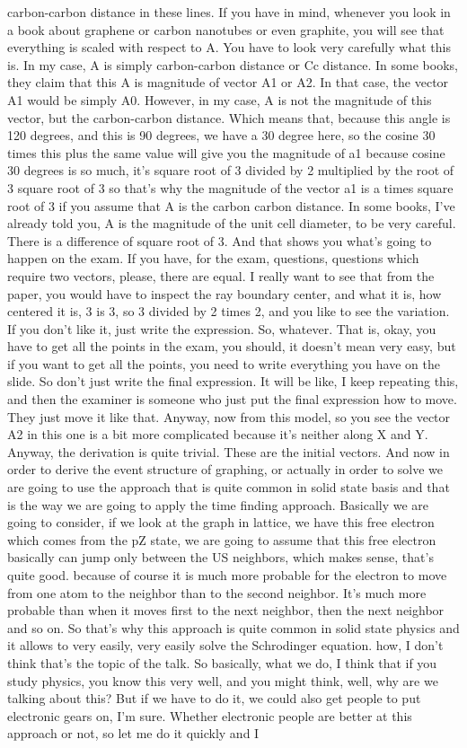 carbon-carbon distance in these lines. If you have in mind, whenever you look in a book about graphene or carbon nanotubes or even graphite, you will see that everything is scaled with respect to A. You have to look very carefully what this is. In my case, A is simply carbon-carbon distance or Cc distance. In some books, they claim that this A is magnitude of vector A1 or A2. In that case, the vector A1 would be simply A0. However, in my case, A is not the magnitude of this vector, but the carbon-carbon distance. Which means that, because this angle is 120 degrees, and this is 90 degrees, we have a 30 degree here, so the cosine 30 times this plus the same value will give you the magnitude of a1 because cosine 30 degrees is so much, it's square root of 3 divided by 2 multiplied by the root of 3 square root of 3 so that's why the magnitude of the vector a1 is a times square root of 3 if you assume that A is the carbon carbon distance. In some books, I've already told you, A is the magnitude of the unit cell diameter, to be very careful. There is a difference of square root of 3. And that shows you what's going to happen on the exam. If you have, for the exam, questions, questions which require two vectors, please, there are equal. I really want to see that from the paper, you would have to inspect the ray boundary center, and what it is, how centered it is, 3 is 3, so 3 divided by 2 times 2, and you like to see the variation. If you don't like it, just write the expression. So, whatever. That is, okay, you have to get all the points in the exam, you should, it doesn't mean very easy, but if you want to get all the points, you need to write everything you have on the slide. So don't just write the final expression. It will be like, I keep repeating this, and then the examiner is someone who just put the final expression how to move. They just move it like that. Anyway, now from this model, so you see the vector A2 in this one is a bit more complicated because it's neither along X and Y. Anyway, the derivation is quite trivial. These are the initial vectors. And now in order to derive the event structure of graphing, or actually in order to solve we are going to use the approach that is quite common in solid state basis and that is the way we are going to apply the time finding approach. Basically we are going to consider, if we look at the graph in lattice, we have this free electron which comes from the pZ state, we are going to assume that this free electron basically can jump only between the US neighbors, which makes sense, that's quite good. because of course it is much more probable for the electron to move from one atom to the neighbor than to the second neighbor. It's much more probable than when it moves first to the next neighbor, then the next neighbor and so on. So that's why this approach is quite common in solid state physics and it allows to very easily, very easily solve the Schrodinger equation. how, I don't think that's the topic of the talk. So basically, what we do, I think that if you study physics, you know this very well, and you might think, well, why are we talking about this? But if we have to do it, we could also get people to put electronic gears on, I'm sure. Whether electronic people are better at this approach or not, so let me do it quickly and I 